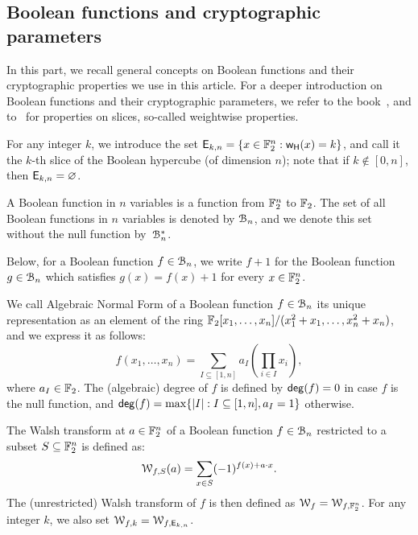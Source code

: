 \documentclass[11pt]{llncs}
\begin{document}
\subsection{Boolean functions and cryptographic parameters}

In this part, we recall general concepts on Boolean functions and their cryptographic properties we use in this article. 
For a deeper introduction on Boolean functions and their cryptographic parameters, we refer to the book~\cite{Carlet20}, and to~\cite{TOSC:CarMeaRot17} for properties on slices, so-called weightwise properties.

\begin{definition}[Slice]
    For any integer $k$, we introduce the set $\mathsf{E}_{k,n}=\{x\in \mathbb{F}_2^n:\mathsf{w_H}(x)=k\}$, and call it the $k$-th slice of the Boolean hypercube (of dimension $n$); note that if $k\not\in[0,n]$, then $\mathsf{E}_{k,n}=\varnothing$.
\end{definition}

\begin{definition}\label{def:bool_f}
	A Boolean function in $n$ variables is a function from $\mathbb{F}_2^n$ to $\mathbb{F}_2$. The set of all Boolean functions in $n$ variables is denoted by $\mathcal{B}_n$, and we denote this set without the null function by~$\mathcal{B}_n^*$.
\end{definition}

Below, for a Boolean function $f\in\mathcal{B}_n$, we write $f+1$ for the Boolean function $g\in\mathcal{B}_n$ which satisfies $g(x)=f(x)+1$ for every $x\in\mathbb{F}_2^n$.

\begin{definition}\label{def:anf}
	We call Algebraic Normal Form of a Boolean function $f\in\mathcal{B}_n$ its unique representation as an element of the ring $\mathbb{F}_2[x_1,\dots,x_n]/(x_1^2+x_1,\dots,x_n^2+x_n)$, and we express it as follows:
	\[
		f(x_1,\dots,x_n)= \sum_{I \subseteq [1,n]} a_I \left( \prod_{i \in I} x_i \right),
	\]
	where $a_I\in \mathbb{F}_2$. The (algebraic) degree of $f$ is defined by $\mathsf{deg}(f)=0$ in case $f$ is the null function, and $\mathsf{deg}(f)=\max\{ |I|:I\subseteq[1,n],a_I=1\}$ otherwise.
\end{definition}

\begin{definition}\label{def:walsh_transform}
	The Walsh transform at $a \in \mathbb{F}_2^n$ of a Boolean function $f\in\mathcal{B}_n$ restricted to a subset $S\subseteq \mathbb{F}_2^n$ is defined as:
    \[  \mathcal W_{f,S} (a) = \sum_{x\in S} (-1)^{f(x)+a \cdot x}.\]
    The (unrestricted) Walsh transform of $f$ is then defined as $\mathcal W_{f}=\mathcal W_{f,\mathbb{F}_2^n}$. For any integer $k$, we also set $\mathcal W_{f,k}=\mathcal W_{f,\mathsf{E}_{k,n}}$.
\end{definition}
\end{document}
